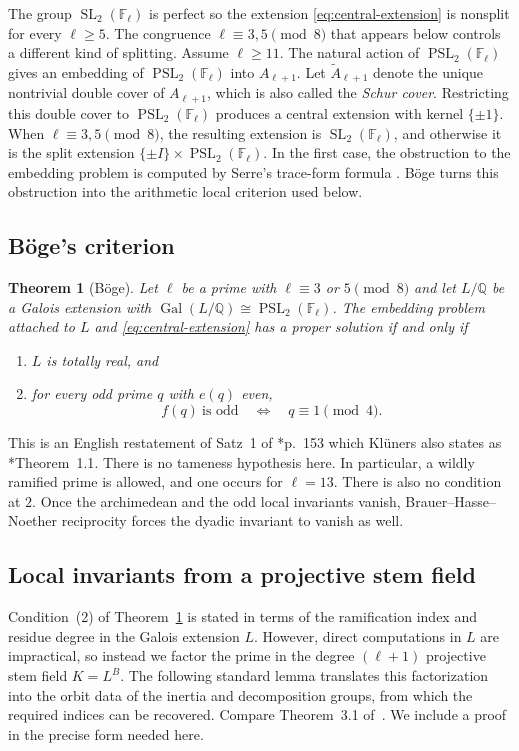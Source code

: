 \documentclass[10pt]{amsart}
\numberwithin{equation}{section}
\newtheorem{theorem}{Theorem}[section]
\theoremstyle{definition}
\theoremstyle{remark}
\newcommand{\F}{\mathbb{F}}
\newcommand{\Q}{\mathbb{Q}}
\newcommand{\SL}{\operatorname{SL}}
\newcommand{\PSL}{\operatorname{PSL}}
\newcommand{\Gal}{\operatorname{Gal}}
\begin{document}
The group $\SL_2(\F_\ell)$ is perfect so the extension \eqref{eq:central-extension} is nonsplit for every
$\ell\geq5$. The congruence
$\ell\equiv3,5\pmod8$ that appears below controls a different kind of splitting.
Assume $\ell\geq 11$. The natural action of $\PSL_2(\F_\ell)$ gives an embedding of $\PSL_2(\F_\ell)$ into $A_{\ell+1}$. Let $\widetilde A_{\ell+1}$ denote the unique nontrivial double cover of $A_{\ell+1}$, which is also called the \emph{Schur cover}. Restricting this double cover to $\PSL_2(\F_\ell)$ produces a central extension with kernel $\{\pm1\}$.  When $\ell\equiv3,5\pmod8$, the resulting extension is $\SL_2(\F_\ell)$, and otherwise it is the split extension $\{\pm I\}\times \PSL_2(\F_\ell)$.
  In the first case, the obstruction to the embedding problem is computed by Serre's trace-form formula \cite{Serre1984}. B\"oge turns this obstruction into the
arithmetic local criterion used below. 

\subsection{B\"oge's criterion}\label{subsec:boege}

\begin{theorem}[B\"oge]\label{thm:boege}
Let $\ell$ be a prime with $\ell\equiv3$ or $5\pmod 8$ and let $L/\Q$ be a
Galois extension with $\Gal(L/\Q)\cong\PSL_2(\F_\ell)$.  The embedding
problem attached to $L$ and \eqref{eq:central-extension} has a proper
solution if and only if
\begin{enumerate}
 \item $L$ is totally real, and
 \item for every odd prime $q$ with $e(q)$ even,
 \[
   f(q)\ \text{is odd}
   \quad\Longleftrightarrow\quad
   q\equiv1\pmod4 .
 \]
\end{enumerate}
\end{theorem}

This is an English restatement of Satz~1 of \cite{Boege1990}*{p.~153} which Kl\"uners also states as \cite{Klueners2000}*{Theorem~1.1}. There is no tameness hypothesis here. In particular, a wildly
ramified prime is allowed, and one occurs for $\ell=13$. There is also no condition at $2$.  Once the archimedean and the odd
local invariants vanish, Brauer--Hasse--Noether reciprocity forces the
dyadic invariant to vanish as well.

\subsection{Local invariants from a projective stem field}\label{subsec:orbit-dictionary}
  Condition~(2) of Theorem~\ref{thm:boege} is stated in terms of the
  ramification index and residue degree in the Galois extension $L$. However, direct computations in $L$ are impractical, so instead we factor the prime in the degree $(\ell+1)$ projective stem field $K=L^B$. The following standard lemma translates this factorization into the orbit data of the inertia and decomposition groups, from which the required indices can be recovered. Compare Theorem~3.1 of~\cite{BrumerKramer2012}. We include a proof in the
  precise form needed here.
\end{document}
